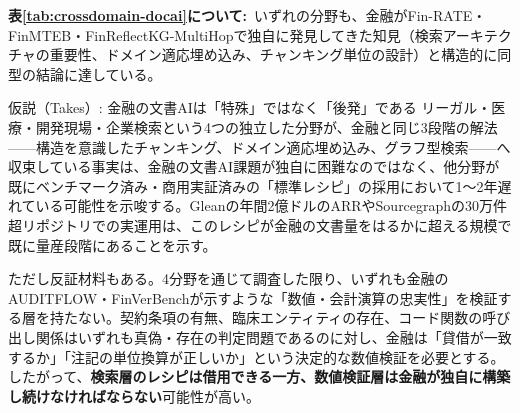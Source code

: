 {\small\color{brandgray}\textbf{表\ref{tab:crossdomain-docai}について:}\ いずれの分野も、金融がFin-RATE・FinMTEB・FinReflectKG-MultiHopで独自に発見してきた知見（検索アーキテクチャの重要性、ドメイン適応埋め込み、チャンキング単位の設計）と構造的に同型の結論に達している。}

\begin{insight}{仮説（Takes）: 金融の文書AIは「特殊」ではなく「後発」である}
リーガル・医療・開発現場・企業検索という4つの独立した分野が、金融と同じ3段階の解法——構造を意識したチャンキング、ドメイン適応埋め込み、グラフ型検索——へ収束している事実は、金融の文書AI課題が独自に困難なのではなく、他分野が既にベンチマーク済み・商用実証済みの「標準レシピ」の採用において1〜2年遅れている可能性を示唆する。Gleanの年間2億ドルのARRやSourcegraphの30万件超リポジトリでの実運用は、このレシピが金融の文書量をはるかに超える規模で既に量産段階にあることを示す。

ただし反証材料もある。4分野を通じて調査した限り、いずれも金融のAUDITFLOW・FinVerBenchが示すような「数値・会計演算の忠実性」を検証する層を持たない。契約条項の有無、臨床エンティティの存在、コード関数の呼び出し関係はいずれも真偽・存在の判定問題であるのに対し、金融は「貸借が一致するか」「注記の単位換算が正しいか」という決定的な数値検証を必要とする。したがって、\textbf{検索層のレシピは借用できる一方、数値検証層は金融が独自に構築し続けなければならない}可能性が高い。
\end{insight}
